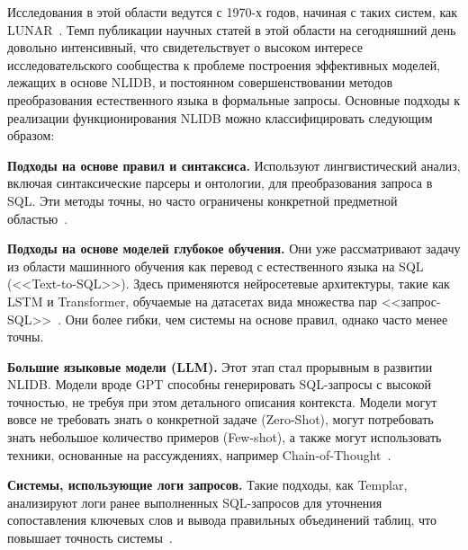 Исследования в этой области ведутся с 1970-х годов, начиная с таких систем,
как LUNAR~\cite{kimNaturalLanguageSQL2020,liuNLI4DBSystematicReview2025, zhuLargeLanguageModel2024}.
Темп публикации научных
статей в этой области на сегодняшний день довольно интенсивный, что свидетельствует о
высоком интересе исследовательского сообщества
к проблеме построения эффективных моделей, лежащих в основе NLIDB, и постоянном совершенствовании методов
преобразования естественного языка в формальные запросы.
Основные подходы к реализации функционирования NLIDB можно классифицировать следующим образом:
\begin{compactitem}
      \item \textbf{Подходы на основе правил и синтаксиса.} Используют лингвистический анализ,
      включая синтаксические парсеры и онтологии, для преобразования запроса в SQL.
      Эти методы точны, но часто ограничены конкретной предметной
      областью~\cite{anisyahNaturalLanguageInterface2019, poetraNaturalLanguageInterface2019,
            hamazNovelMethodProviding2017, pazosr.ComparativeStudyCustomization2016,
            baskaranSyntaticSemanticVisual2013}.
      \item \textbf{Подходы на основе моделей глубокое обучения.} Они уже рассматривают задачу
      из области машинного обучения как перевод с
      естественного языка на SQL (<<Text-to-SQL>>). Здесь применяются нейросетевые архитектуры,
      такие как LSTM и Transformer, обучаемые на датасетах
      вида множества пар <<запрос-SQL>>~\cite{bradDatasetNeuralNatural2017,
            visperasModernTexttoSQLSemantic2023}. Они более гибки, чем системы на основе правил,
      однако часто менее точны.
      \item \textbf{Большие языковые модели (LLM).} Этот этап стал прорывным в развитии NLIDB.
      Модели вроде GPT способны генерировать SQL-запросы с высокой точностью, не требуя
      при этом детального описания контекста. Модели могут вовсе не требовать знать о конкретной
      задаче (Zero-Shot), могут потребовать знать небольшое количество примеров (Few-shot), а также
      могут использовать техники, основанные на рассуждениях, например
      Chain-of-Thought~\cite{liCodeSBuildingOpensource2024,
            zhuLargeLanguageModel2024}.
      \item \textbf{Системы, использующие логи запросов.} Такие подходы, как Templar,
      анализируют логи ранее выполненных SQL-запросов для уточнения сопоставления
      ключевых слов и вывода правильных объединений таблиц, что повышает точность
      системы~\cite{baikBridgingSemanticGap2019,kimNaturalLanguageSQL2020}.
\end{compactitem}

